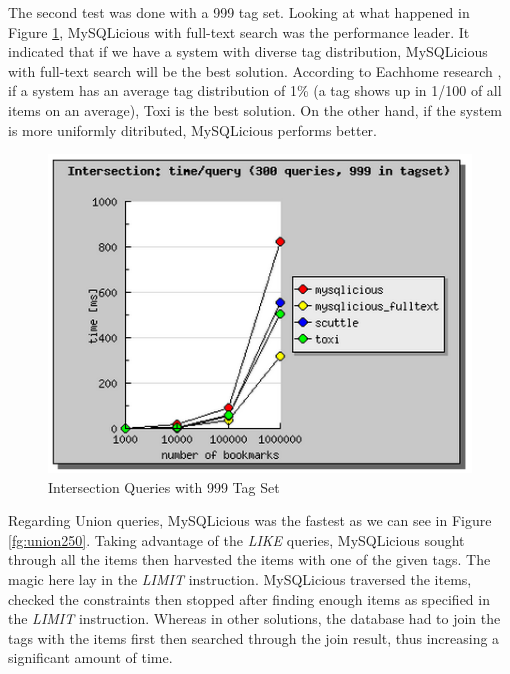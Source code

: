 The second test was done with a 999 tag set. Looking at what happened in Figure \ref{fg:intersection999}, MySQLicious with full-text search was the performance leader. It indicated that if we have a system with diverse tag distribution, MySQLicious with full-text search will be the best solution. According to Eachhome research \cite{puiperformance}, if a system has an average tag distribution of 1\% (a tag shows up in 1/100 of all items on an average), Toxi is the best solution. On the other hand, if the system is more uniformly ditributed, MySQLicious performs better.

\begin{figure}[!h]
\begin{centering}
\includegraphics[scale=0.8]{pics/intersection999}
\caption{Intersection Queries with 999 Tag Set}\label{fg:intersection999}
\end{centering}
\end{figure}

Regarding Union queries, MySQLicious was the fastest as we can see in Figure \ref{fg:union250}. Taking advantage of the \textit{LIKE} queries, MySQLicious sought through all the items then harvested the items with one of the given tags. The magic here lay in the \textit{LIMIT} instruction. MySQLicious traversed the items, checked the constraints then stopped after finding enough items as specified in the \textit{LIMIT} instruction. Whereas in other solutions, the database had to join the tags with the items first then searched through the join result, thus increasing a significant amount of time.

